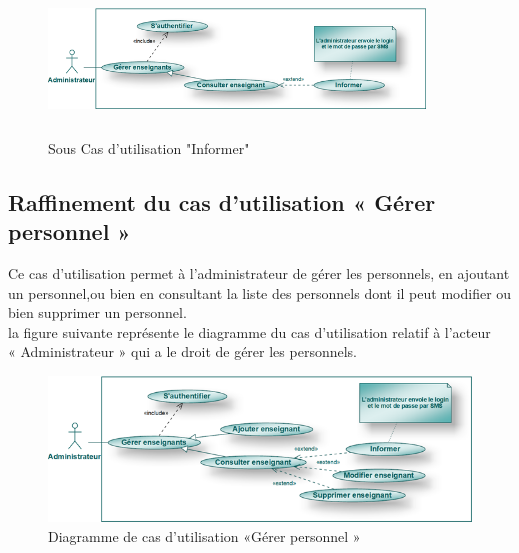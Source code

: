 \documentclass[12 pt]{report}
\begin{document}
\begin{figure}[h]
\begin{center}
\includegraphics[width= 10cm , height =4cm]{informer_ens.png}
\caption{Sous Cas d'utilisation "Informer"}
\end{center}
\end{figure}
\subsection{Raffinement du cas d’utilisation « Gérer personnel »}
Ce cas d’utilisation permet à l’administrateur de gérer les personnels, en ajoutant
un personnel,ou bien en consultant la liste des personnels dont il peut modifier ou
bien supprimer un personnel.\\
la figure suivante représente le diagramme du cas d’utilisation  relatif à l’acteur \\« Administrateur » qui a le droit de gérer les personnels.
 \begin{figure}[h]
\includegraphics[width= 15 cm ,height= 6 cm]{admin2.png}
\caption{ Diagramme de cas d'utilisation  «Gérer personnel »}
\end{figure}
\end{document}
